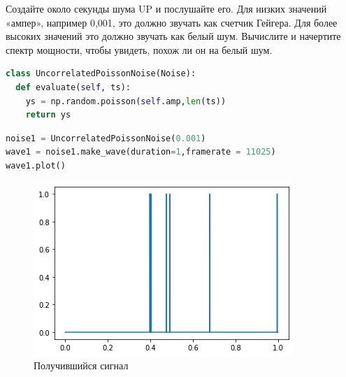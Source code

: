 Создайте около секунды шума UP и послушайте его. Для низких значений «ампер», например 0,001, это должно звучать как счетчик Гейгера. Для более высоких значений это должно звучать как белый шум. Вычислите и начертите спектр мощности, чтобы увидеть, похож ли он на белый шум.

\begin{lstlisting}[language=Python]
class UncorrelatedPoissonNoise(Noise):
  def evaluate(self, ts):
    ys = np.random.poisson(self.amp,len(ts))
    return ys
\end{lstlisting}
\begin{lstlisting}[language=Python]
noise1 = UncorrelatedPoissonNoise(0.001)
wave1 = noise1.make_wave(duration=1,framerate = 11025)
wave1.plot()
\end{lstlisting}
\begin{figure}[H]
	\begin{center}
		\includegraphics[scale=1]{fig/lab04/lab04_37_0.png}
		\caption{Получившийся сигнал}
	\end{center}
\end{figure}

